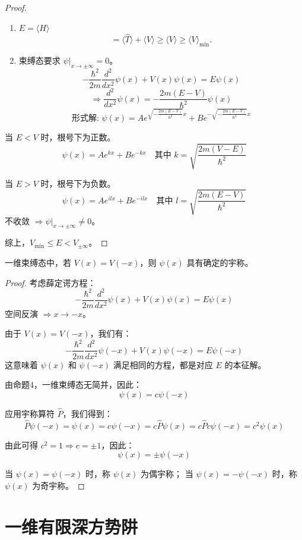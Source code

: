\documentclass[lang=cn,10pt]{elegantbook}
\begin{document}
\begin{proof}
	\begin{enumerate}
		\item $E = \langle H \rangle$
		\[
		= \langle \hat{T} \rangle + \langle V \rangle \geq \langle V \rangle \geq \langle V \rangle_{\text{min}}.
		\]
		\item 束缚态要求 $\psi \big|_{x \to \pm\infty} = 0$。
		\[
		-\frac{\hbar^2}{2m} \frac{d^2}{dx^2} \psi(x) + V(x) \psi(x) = E \psi(x)
		\]
		\[
		\Longrightarrow \frac{d^2}{dx^2} \psi(x) = -\frac{2m(E-V)}{\hbar^2} \psi(x)
		\]
		\[
		\text{形式解: } \psi(x) = A e^{\sqrt{-\frac{2m(E-V)}{\hbar^2}} x} + B e^{-\sqrt{-\frac{2m(E-V)}{\hbar^2}} x}
		\]
	\end{enumerate}
	
	当 $E < V$ 时，根号下为正数。
	\[
	\psi(x) = A e^{kx} + B e^{-kx} \quad \text{其中 } k = \sqrt{\frac{2m(V-E)}{\hbar^2}}
	\]
	
	当 $E > V$ 时，根号下为负数。
	\[
	\psi(x) = A e^{ilx} + B e^{-ilx} \quad \text{其中 } l = \sqrt{\frac{2m(E-V)}{\hbar^2}}
	\]
	不收敛 $\Rightarrow \psi \big|_{x \to \pm\infty} \neq 0$。
	
	综上，$V_{\text{min}} \leq E < V_{\pm\infty}$。
\end{proof}
\begin{proposition}
	一维束缚态中，若 $V(x) = V(-x)$，则 $\psi(x)$ 具有确定的宇称。
\end{proposition}

\begin{proof}
	考虑薛定谔方程：
	\[
	-\frac{\hbar^2}{2m} \frac{d^2}{dx^2} \psi(x) + V(x) \psi(x) = E \psi(x)
	\]
	空间反演 $\Rightarrow x \rightarrow -x$。
	
	由于 $V(x) = V(-x)$，我们有：
	\[
	-\frac{\hbar^2}{2m} \frac{d^2}{dx^2} \psi(-x) + V(x) \psi(-x) = E \psi(-x)
	\]
	这意味着 $\psi(x)$ 和 $\psi(-x)$ 满足相同的方程，都是对应 $E$ 的本征解。
	
	由命题4，一维束缚态无简并，因此：
	\[
		\psi(x) = c \psi(-x)
	\]
	
	应用宇称算符 $\hat{P}$，我们得到：
	\[
	\hat{P} \psi(-x) = \psi(x) = c \psi(-x) = c \hat{P} \psi(x) = c \hat{P} c \psi(-x) = c^2 \psi(x)
	\]
	
	由此可得 $c^2 = 1 \Rightarrow c = \pm 1$，因此：
	\[
	\psi(x) = \pm \psi(-x)
	\]
	
	当 $\psi(x) = \psi(-x)$ 时，称 $\psi(x)$ 为偶宇称；
	当 $\psi(x) = -\psi(-x)$ 时，称 $\psi(x)$ 为奇宇称。
\end{proof}

\section{一维有限深方势阱}
\end{document}
